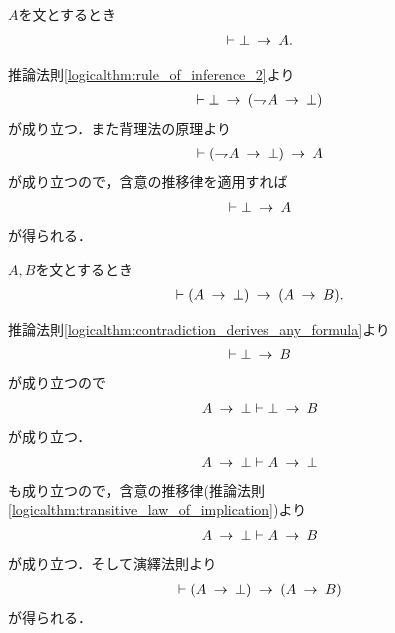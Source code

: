	\begin{screen}
		\begin{logicalthm}[矛盾からはあらゆる式が導かれる]\label{logicalthm:contradiction_derives_any_formula}
			$A$を文とするとき
			\begin{align}
				\vdash \bot \rarrow A.
			\end{align}
		\end{logicalthm}
	\end{screen}
	
	\begin{prf}
		推論法則\ref{logicalthm:rule_of_inference_2}より
		\begin{align}
			\vdash \bot \rarrow (\negation A \rarrow \bot)
		\end{align}
		が成り立つ．また背理法の原理より
		\begin{align}
			\vdash (\negation A \rarrow \bot) \rarrow A
		\end{align}
		が成り立つので，含意の推移律を適用すれば
		\begin{align}
			\vdash \bot \rarrow A
		\end{align}
		が得られる．
		\QED
	\end{prf}
	
	\begin{screen}
		\begin{logicalthm}[矛盾を導く式はあらゆる式を導く]\label{logicalthm:formula_leading_to_contradiction_derives_any_formula}
			$A,B$を文とするとき
			\begin{align}
				\vdash (A \rarrow \bot) \rarrow (A \rarrow B).
			\end{align}
		\end{logicalthm}
	\end{screen}
	
	\begin{prf}
		推論法則\ref{logicalthm:contradiction_derives_any_formula}より
		\begin{align}
			\vdash \bot \rarrow B
		\end{align}
		が成り立つので
		\begin{align}
			A \rarrow \bot \vdash \bot \rarrow B
		\end{align}
		が成り立つ．
		\begin{align}
			A \rarrow \bot \vdash A \rarrow \bot
		\end{align}
		も成り立つので，含意の推移律(推論法則\ref{logicalthm:transitive_law_of_implication})より
		\begin{align}
			A \rarrow \bot \vdash A \rarrow B
		\end{align}
		が成り立つ．そして演繹法則より
		\begin{align}
			\vdash (A \rarrow \bot) \rarrow (A \rarrow B)
		\end{align}
		が得られる．
		\QED
	\end{prf}
	
